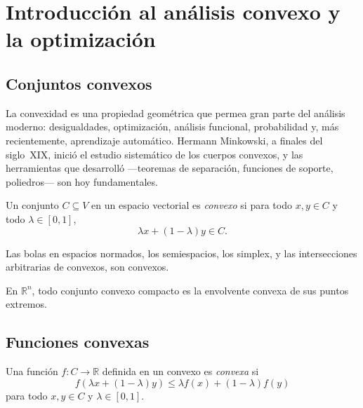 \chapter{Introducción al análisis convexo y la optimización}
\label{ch:analisis-convexo}

\section{Conjuntos convexos}

La convexidad es una propiedad geométrica que permea gran parte del análisis moderno: desigualdades, optimización, análisis funcional, probabilidad y, más recientemente, aprendizaje automático. Hermann Minkowski, a finales del siglo~XIX, inició el estudio sistemático de los cuerpos convexos, y las herramientas que desarrolló ---teoremas de separación, funciones de soporte, poliedros--- son hoy fundamentales.

\begin{definition}
\label{def:convexo}
Un conjunto $C\subseteq V$ en un espacio vectorial es \emph{convexo} si para todo $x,y\in C$ y todo $\lambda\in[0,1]$,
\[
  \lambda x+(1-\lambda)y\in C.
\]
\end{definition}

\begin{example}
\label{ej:convexos-basicos}
Las bolas en espacios normados, los semiespacios, los simplex, y las intersecciones arbitrarias de convexos, son convexos.
\end{example}

\begin{theorem}[Minkowski]
\label{teo:minkowski}
En $\mathbb{R}^n$, todo conjunto convexo compacto es la envolvente convexa de sus puntos extremos.
\end{theorem}

\section{Funciones convexas}

\begin{definition}
\label{def:funcion-convexa}
Una función $f\colon C\to\mathbb{R}$ definida en un convexo es \emph{convexa} si
\[
  f(\lambda x+(1-\lambda)y)\leq\lambda f(x)+(1-\lambda)f(y)
\]
para todo $x,y\in C$ y $\lambda\in[0,1]$.
\end{definition}

